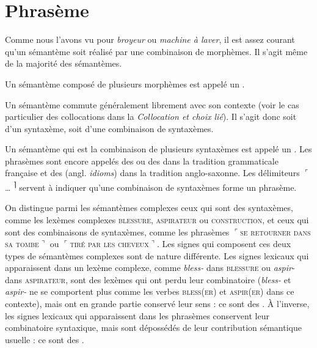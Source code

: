 \section{Phrasème}\label{sec:2.3.7}

Comme nous l’avons vu pour \textit{broyeur} ou \textit{machine à laver}, il est assez courant qu’un sémantème soit réalisé par une combinaison de morphèmes. Il s’agit même de la majorité des sémantèmes.

\begin{styleLivreImportant}
Un sémantème composé de plusieurs morphèmes est appelé un .
\end{styleLivreImportant}

Un sémantème commute généralement librement avec son contexte (voir le cas particulier des collocations dans la  \textit{Collocation et choix lié}). Il s’agit donc soit d’un syntaxème, soit d’une combinaison de syntaxèmes.

\begin{styleLivreImportant}
Un sémantème qui est la combinaison de plusieurs syntaxèmes est appelé un . Les phrasèmes sont encore appelés des  ou des  dans la tradition grammaticale française et des  (angl. \textit{idioms}) dans la tradition anglo-saxonne. Les délimiteurs $⌜$…\textsuperscript{ ⌉} servent à indiquer qu’une combinaison de syntaxèmes forme un phrasème.
\end{styleLivreImportant}

On distingue parmi les sémantèmes complexes ceux qui sont des syntaxèmes, comme les lexèmes complexes \textsc{blessure,} \textsc{aspirateur} ou \textsc{construction,} et ceux qui sont des combinaisons de syntaxèmes, comme les phrasèmes $⌜$\textsc{se} \textsc{retourner} \textsc{dans} \textsc{sa} \textsc{tombe}$⌝$ ou $⌜$\textsc{tiré} \textsc{par} \textsc{les} \textsc{cheveux}$⌝$. Les signes qui composent ces deux types de sémantèmes complexes sont de nature différente. Les signes lexicaux qui apparaissent dans un lexème complexe, comme \textit{bless-} dans \textsc{blessure} ou \textit{aspir}{}- dans \textsc{aspirateur}, sont des lexèmes qui ont perdu leur combinatoire (\textit{bless-} et \textit{aspir-} ne se comportent plus comme les verbes \textsc{bless}(\textsc{er}) et \textsc{aspir}(\textsc{er}) dans ce contexte), mais ont en grande partie conservé leur sens : ce sont des . À l’inverse, les signes lexicaux qui apparaissent dans les phrasèmes conservent leur combinatoire syntaxique, mais sont dépossédés de leur contribution sémantique usuelle : ce sont des .

